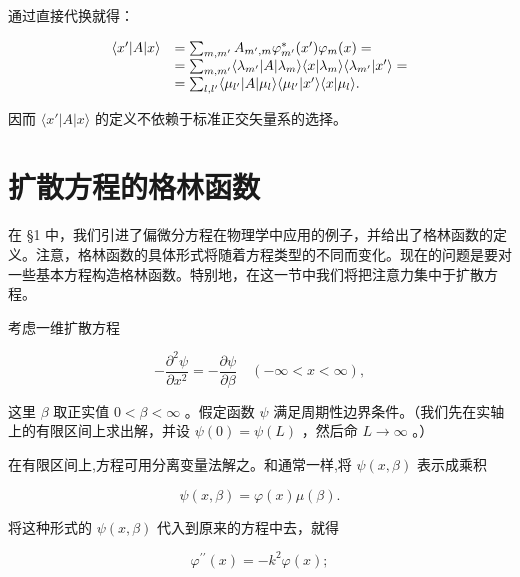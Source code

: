 通过直接代换就得：

\begin{equation*}
\begin{array}{r l} \langle x ^ {\prime} | A | x \rangle & = \sum_ {m, m ^ {\prime}} A _ {m ^ {\prime}, m} \varphi_ {m ^ {\prime}} ^ {*} (x ^ {\prime}) \varphi_ {m} (x) = \\ & = \sum_ {m, m ^ {\prime}} \langle \lambda_ {m ^ {\prime}} | A | \lambda_ {m} \rangle \langle x | \lambda_ {m} \rangle \langle \lambda_ {m ^ {\prime}} | x ^ {\prime} \rangle = \\ & = \sum_ {l, l ^ {\prime}} \langle \mu_ {l ^ {\prime}} | A | \mu_ {l} \rangle \langle \mu_ {l ^ {\prime}} | x ^ {\prime} \rangle \langle x | \mu_ {l} \rangle . \end{array}
\end{equation*}

因而 $\langle x' | A | x \rangle$ 的定义不依赖于标准正交矢量系的选择。

\section{扩散方程的格林函数}

在 §1 中，我们引进了偏微分方程在物理学中应用的例子，并给出了格林函数的定义。注意，格林函数的具体形式将随着方程类型的不同而变化。现在的问题是要对一些基本方程构造格林函数。特别地，在这一节中我们将把注意力集中于扩散方程。

考虑一维扩散方程

\begin{equation*}
- \frac {\partial^ {2} \psi}{\partial x ^ {2}} = - \frac {\partial \psi}{\partial \beta} \quad (- \infty <   x <   \infty),
\end{equation*}

这里 $\beta$ 取正实值 $0 < \beta < \infty$ 。假定函数 $\psi$ 满足周期性边界条件。（我们先在实轴上的有限区间上求出解，并设 $\psi(0) = \psi(L)$ ，然后命 $L \to \infty$ 。）

在有限区间上,方程可用分离变量法解之。和通常一样,将 $\psi(x,\beta)$ 表示成乘积

\begin{equation*}
\psi (x, \beta) = \varphi (x) \mu (\beta).
\end{equation*}

将这种形式的 $\psi (x,\beta)$ 代入到原来的方程中去，就得

\begin{equation*}
\varphi^ {\prime \prime} (x) = - k ^ {2} \varphi (x);
\end{equation*}

